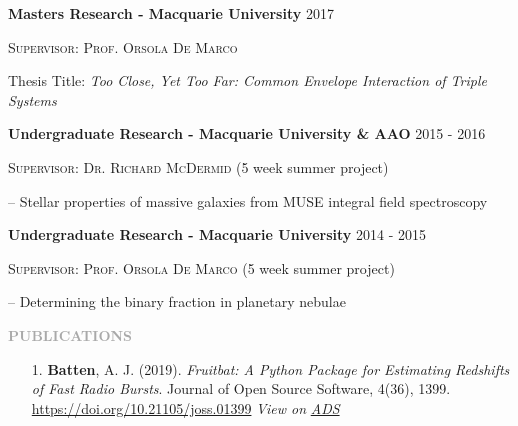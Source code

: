 \documentclass[11pt]{extarticle}
\def\Vhrulefill{{\color{BurntOrange}{\leavevmode\leaders\hrule height 1.2ex depth \dimexpr0.5pt-0.9ex\hfill\kern5pt}}}
\begin{document}
{\large \textbf{Masters Research - Macquarie University}} \hfill {\large 2017} \par
\textsc{Supervisor: Prof. Orsola De Marco} \par
Thesis Title: \emph{Too Close, Yet Too Far: Common Envelope Interaction of Triple Systems} \par
 \par
\vspace{2ex}

{\large \textbf{Undergraduate Research - Macquarie University \& AAO}} \hfill {\large 2015 - 2016} \par 
\textsc{Supervisor: Dr. Richard McDermid} (5 week summer project) \par 
\indent \indent -- Stellar properties of massive galaxies from MUSE integral field spectroscopy

\vspace{2ex}
{\large \textbf{Undergraduate Research - Macquarie University}} \hfill {\large 2014 - 2015} \par
\textsc{Supervisor: Prof. Orsola De Marco} (5 week summer project) \par
\indent \indent -- Determining the binary fraction in planetary nebulae

\par


\vspace{3ex}
\noindent
\textcolor{darkgray}{\Large\normalfont\bfseries\MakeUppercase{Publications}} \Vhrulefill
\vspace{2ex}

\begin{enumerate}

    \item[1.] \textbf{Batten}, A. J. (2019). \emph{Fruitbat: A Python Package for Estimating Redshifts of Fast Radio Bursts}. Journal of Open Source Software, 4(36), 1399. \href{https://doi.org/10.21105/joss.01399}{https://doi.org/10.21105/joss.01399} \emph{View on} \href{https://ui.adsabs.harvard.edu/abs/2019JOSS....4.1399B/abstract}{\emph{ADS}}
\end{enumerate}
\end{document}
